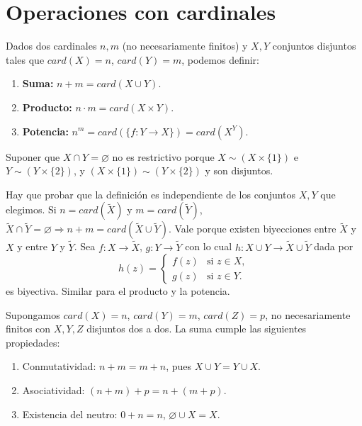 \section{Operaciones con cardinales}

Dados dos cardinales $n,m$ (no necesariamente finitos) y $X, Y$ conjuntos disjuntos tales que $card(X) = n$, $card(Y) = m$, podemos definir:

\begin{enumerate}
  \item \textbf{Suma:} $n+m = card(X \cup Y)$.
  \item \textbf{Producto:} $n \cdot m = card(X \times Y)$.
  \item \textbf{Potencia:} $n^m = card(\{ f: Y \to X \}) = card(X^Y)$.
\end{enumerate}

\begin{note}
  Suponer que $X \cap Y = \varnothing$ no es restrictivo porque $X \sim (X \times \{1\})$ e $Y \sim (Y \times \{ 2\})$, y $(X \times \{1\}) \sim (Y \times \{ 2\})$ y son disjuntos.
\end{note}

\begin{note}
  Hay que probar que la definición es independiente de los conjuntos $X, Y$ que elegimos.
  Si $n = card(\tilde{X})$ y $m = card(\tilde{Y})$, $\tilde{X} \cap \tilde{Y} = \varnothing \Rightarrow n+m=card(\tilde{X} \cup \tilde{Y})$. Vale porque existen biyecciones entre $\tilde{X}$ y $X$ y entre $Y$ y $\tilde{Y}$.
  Sea $f: X \to \tilde{X}$, $g:Y \to \tilde{Y}$ con lo cual $h: X \cup Y \to \tilde{X} \cup \tilde{Y}$ dada por
  \[
    h(z) = \begin{cases}
      f(z) & \text{si } z \in X, \\
      g(z) & \text{si } z \in Y.
    \end{cases}
  \]
  es biyectiva.
  Similar para el producto y la potencia.
\end{note}

Supongamos $card(X) = n$, $card(Y) = m$, $card(Z) = p$, no necesariamente
finitos con $X, Y, Z$ disjuntos dos a dos. La suma cumple las siguientes
propiedades:

\begin{prop}
  \begin{enumerate}
    \item Conmutatividad: $n+m=m+n$, pues $X \cup Y = Y \cup X$.
    \item Asociatividad: $(n+m)+p=n+(m+p)$.
    \item Existencia del neutro: $0+n=n$, $\varnothing \cup X=X$.
  \end{enumerate}
\end{prop}

